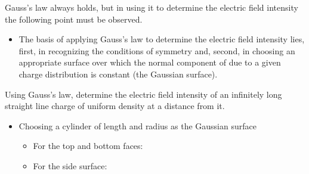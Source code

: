 \begin{ELremark}{}

Gauss's law always holds, but in using it to determine the electric field intensity the following point must be observed.

\begin{itemize}
\tightlist
\item
  The basis of applying Gauss's law to determine the electric field intensity lies, first, in recognizing the conditions of symmetry and, second, in choosing an appropriate surface over which the normal component of  due to a given charge distribution is constant (the Gaussian surface).
\end{itemize}

\end{ELremark}


\begin{ELexample}{}

Using Gauss's law, determine the electric field intensity of an infinitely long straight line charge of uniform density \ELim{\rho_\ell} at a distance  from it.


\begin{ELsolution}


\begin{itemize}
\tightlist
\item
  Choosing a cylinder of length  and radius  as the Gaussian surface

  \begin{itemize}
  \tightlist
  \item
    For the top and bottom faces: 
  \item
    For the side surface: 
  \end{itemize}
\end{itemize}


\end{ELsolution}

\end{ELexample}

